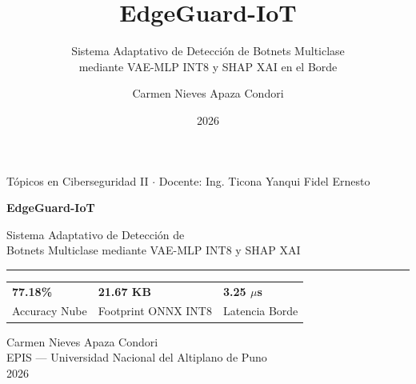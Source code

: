 \documentclass[aspectratio=169, 10pt]{beamer}
\title{\textbf{EdgeGuard-IoT}}
\subtitle{Sistema Adaptativo de Detección de Botnets Multiclase\\
          mediante VAE-MLP INT8 y SHAP XAI en el Borde}
\author{Carmen Nieves Apaza Condori}
\institute{EPIS --- Universidad Nacional del Altiplano de Puno}
\date{2026}
\begin{document}

{
\begin{frame}[plain]

  \hspace{0.1\textwidth}%
  \begin{minipage}{0.85\textwidth}
    \vspace{1.4cm}
    {\color{textmuted}\footnotesize Tópicos en Ciberseguridad II \quad $\cdot$ \quad
     Docente: Ing. Ticona Yanqui Fidel Ernesto}

    \vspace{0.4cm}
    {\color{cyanneon}\LARGE\bfseries EdgeGuard-IoT}

    \vspace{0.3cm}
    {\color{textmain}\large Sistema Adaptativo de Detección de\\Botnets Multiclase mediante VAE-MLP INT8 y SHAP XAI}

    \vspace{0.5cm}
    {\color{textmuted}\rule{0.75\textwidth}{0.4pt}}

    \vspace{0.4cm}
    \begin{tabular}{lll}
      {\color{cyanneon}\large\bfseries 77.18\%} &
      {\color{goldacc}\large\bfseries 21.67 KB} &
      {\color{bluesoft}\large\bfseries 3.25 $\mu$s} \\[2pt]
      {\color{textmuted}\footnotesize Accuracy Nube} &
      {\color{textmuted}\footnotesize Footprint ONNX INT8} &
      {\color{textmuted}\footnotesize Latencia Borde}
    \end{tabular}

    \vspace{0.6cm}
    {\color{textmuted}\small Carmen Nieves Apaza Condori}\\
    {\color{textmuted}\small EPIS --- Universidad Nacional del Altiplano de Puno}\\
    {\color{textmuted}\small 2026}
  \end{minipage}
\end{frame}
}
\end{document}
